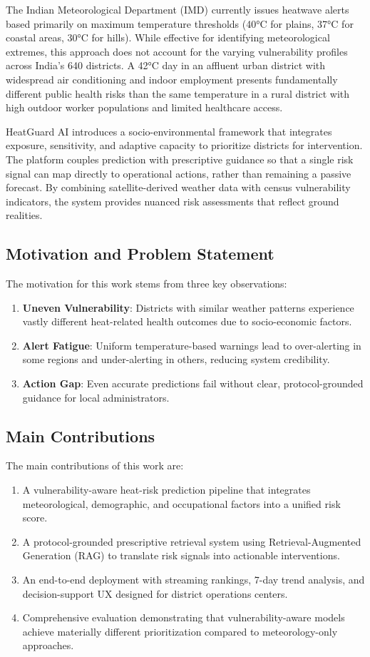 \documentclass[conference]{IEEEtran}
\begin{document}
The Indian Meteorological Department (IMD) currently issues heatwave alerts based primarily on maximum temperature thresholds (40°C for plains, 37°C for coastal areas, 30°C for hills). While effective for identifying meteorological extremes, this approach does not account for the varying vulnerability profiles across India's 640 districts. A 42°C day in an affluent urban district with widespread air conditioning and indoor employment presents fundamentally different public health risks than the same temperature in a rural district with high outdoor worker populations and limited healthcare access.

HeatGuard AI introduces a socio-environmental framework that integrates exposure, sensitivity, and adaptive capacity to prioritize districts for intervention. The platform couples prediction with prescriptive guidance so that a single risk signal can map directly to operational actions, rather than remaining a passive forecast. By combining satellite-derived weather data with census vulnerability indicators, the system provides nuanced risk assessments that reflect ground realities.

\subsection{Motivation and Problem Statement}
The motivation for this work stems from three key observations:
\begin{enumerate}
    \item \textbf{Uneven Vulnerability}: Districts with similar weather patterns experience vastly different heat-related health outcomes due to socio-economic factors.
    \item \textbf{Alert Fatigue}: Uniform temperature-based warnings lead to over-alerting in some regions and under-alerting in others, reducing system credibility.
    \item \textbf{Action Gap}: Even accurate predictions fail without clear, protocol-grounded guidance for local administrators.
\end{enumerate}

\subsection{Main Contributions}
The main contributions of this work are:
\begin{enumerate}
    \item A vulnerability-aware heat-risk prediction pipeline that integrates meteorological, demographic, and occupational factors into a unified risk score.
    \item A protocol-grounded prescriptive retrieval system using Retrieval-Augmented Generation (RAG) to translate risk signals into actionable interventions.
    \item An end-to-end deployment with streaming rankings, 7-day trend analysis, and decision-support UX designed for district operations centers.
    \item Comprehensive evaluation demonstrating that vulnerability-aware models achieve materially different prioritization compared to meteorology-only approaches.
\end{enumerate}
\end{document}
